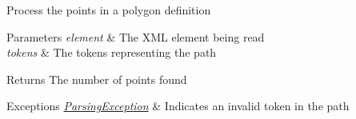 Process the points in a polygon definition


\begin{DoxyParams}{Parameters}
{\em element} & The X\+ML element being read \\
\hline
{\em tokens} & The tokens representing the path \\
\hline
\end{DoxyParams}
\begin{DoxyReturn}{Returns}
The number of points found 
\end{DoxyReturn}

\begin{DoxyExceptions}{Exceptions}
{\em \mbox{\hyperlink{classorg_1_1newdawn_1_1slick_1_1svg_1_1_parsing_exception}{Parsing\+Exception}}} & Indicates an invalid token in the path \\
\hline
\end{DoxyExceptions}

